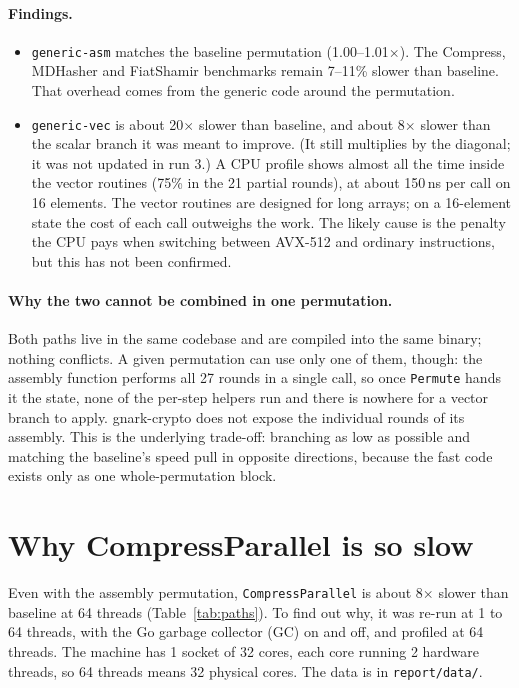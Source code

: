 \documentclass[10pt,a4paper]{article}
\begin{document}
\paragraph{Findings.}
\begin{itemize}
  \item \texttt{generic-asm} matches the baseline permutation (1.00--1.01$\times$). The
    Compress, MDHasher and FiatShamir benchmarks remain 7--11\% slower than baseline. That
    overhead comes from the generic code around the permutation.
  \item \texttt{generic-vec} is about 20$\times$ slower than baseline, and about 8$\times$
    slower than the scalar branch it was meant to improve. (It still multiplies by the
    diagonal; it was not updated in run 3.) A CPU profile shows almost all the
    time inside the vector routines (75\% in the 21 partial rounds), at about 150\,ns per
    call on 16 elements. The vector routines are designed for long arrays; on a 16-element
    state the cost of each call outweighs the work. The likely cause is the penalty the CPU
    pays when switching between AVX-512 and ordinary instructions, but this has not been
    confirmed.
\end{itemize}

\paragraph{Why the two cannot be combined in one permutation.} Both paths live in the same
codebase and are compiled into the same binary; nothing conflicts. A given permutation can
use only one of them, though: the assembly function performs all 27 rounds in a single call,
so once \texttt{Permute} hands it the state, none of the per-step helpers run and there is
nowhere for a vector branch to apply. gnark-crypto does not expose the individual rounds of
its assembly. This is the underlying trade-off: branching as low as possible and matching
the baseline's speed pull in opposite directions, because the fast code exists only as one
whole-permutation block.

\section{Why CompressParallel is so slow}\label{sec:parallel}

Even with the assembly permutation, \texttt{CompressParallel} is about 8$\times$ slower than
baseline at 64 threads (Table~\ref{tab:paths}). To find out why, it was re-run at 1 to 64
threads, with the Go garbage collector (GC) on and off, and profiled at 64 threads. The
machine has 1 socket of 32 cores, each core running 2 hardware threads, so 64 threads means
32 physical cores. The data is in \texttt{report/data/}.
\end{document}
